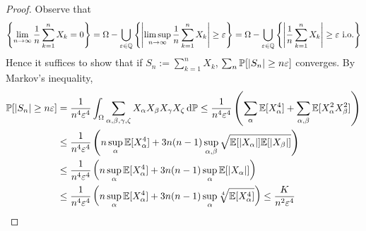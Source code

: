 \begin{proof}
    Observe that 
    \[
        \left\{ \lim_{n \to \infty} \frac{1}{n} \sum_{k=1}^n X_k = 0 \right\}
        = \Omega - \bigcup_{\varepsilon \in \mathbb{Q}} \left\{ \left| \limsup_{n \to \infty} \frac{1}{n} \sum_{k=1}^n X_k \right| \geq \varepsilon \right\}
        = \Omega - \bigcup_{\varepsilon \in \mathbb{Q}} \left\{ \left| \frac{1}{n} \sum_{k=1}^n X_k \right| \geq \varepsilon \text{ i.o.} \right\}
    \]
    Hence it suffices to show that if \(S_n := \sum_{k=1}^n X_k\), \(\sum_n \mathbb{P}[|S_n| \geq n \varepsilon]\) converges. By Markov's inequality, 
    \begin{align*}
        \mathbb{P}[|S_n| \geq n \varepsilon] 
        &= \frac{1}{n^4 \varepsilon^4} \int_{\Omega} \sum_{\alpha, \beta, \gamma, \zeta} X_\alpha X_\beta X_\gamma X_\zeta \, \mathrm{d}\mathbb{P} 
        \leq \frac{1}{n^4 \varepsilon^4} \left(\sum_\alpha \mathbb{E}[X_\alpha^4] + \sum_{\alpha, \beta} \mathbb{E}[X_\alpha^2 X_\beta^2] \right) \\
        &\leq \frac{1}{n^4 \varepsilon^4} \left(n \sup_\alpha \mathbb{E}[X_\alpha^4] + 3n(n-1) \sup_{\alpha, \beta} \sqrt{\mathbb{E}[|X_\alpha|] \mathbb{E}[|X_\beta|]} \right) \\
        &\leq \frac{1}{n^4 \varepsilon^4} \left(n \sup_\alpha \mathbb{E}[X_\alpha^4] + 3n(n-1) \sup_\alpha \mathbb{E}[|X_\alpha|] \right) \\
        &\leq \frac{1}{n^4 \varepsilon^4} \left(n \sup_\alpha \mathbb{E}[X_\alpha^4] + 3n(n-1) \sup_\alpha \sqrt[4]{\mathbb{E}[X_\alpha^4]} \right) 
        \leq \frac{K}{n^2 \varepsilon^4}
    \end{align*}
\end{proof}



